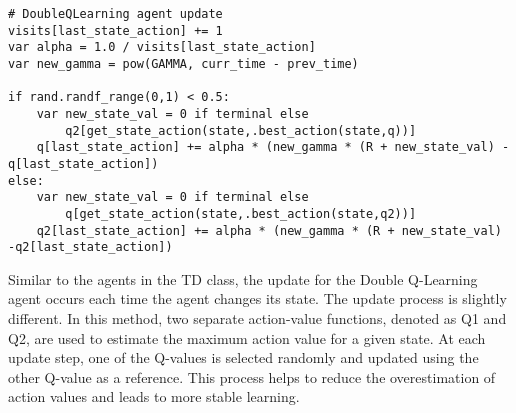 \begin{center}
\hrulefill
\begin{lstlisting}
# DoubleQLearning agent update
visits[last_state_action] += 1
var alpha = 1.0 / visits[last_state_action]
var new_gamma = pow(GAMMA, curr_time - prev_time)

if rand.randf_range(0,1) < 0.5:
    var new_state_val = 0 if terminal else
        q2[get_state_action(state,.best_action(state,q))]
    q[last_state_action] += alpha * (new_gamma * (R + new_state_val) -q[last_state_action])
else:
    var new_state_val = 0 if terminal else
        q[get_state_action(state,.best_action(state,q2))]
    q2[last_state_action] += alpha * (new_gamma * (R + new_state_val) -q2[last_state_action])
\end{lstlisting}
\hrulefill
\end{center}

Similar to the agents in the TD class, the update for the Double Q-Learning agent occurs each time the agent changes its state. The update process is slightly different. In this method, two separate action-value functions, denoted as Q1 and Q2, are used to estimate the maximum action value for a given state. At each update step, one of the Q-values is selected randomly and updated using the other Q-value as a reference. This process helps to reduce the overestimation of action values and leads to more stable learning.